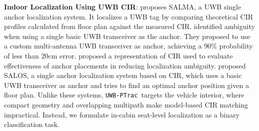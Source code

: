 \documentclass[sigconf]{acmart}
\newcommand{\name}{{{\tt UWB-PTrac}}}
\begin{document}
\noindent
\textbf{Indoor Localization Using UWB CIR}:
\cite{grosswindhager2018salma} proposes SALMA, a UWB single anchor 
localization system. It localizes a UWB tag by comparing theoretical 
CIR profiles calculated from floor plan against the measured CIR. 
\cite{grosswindhager2018salma} identified ambiguity when using a single basic 
UWB transceiver as the anchor. They proposed to use a custom multi-antenna 
UWB transceiver as anchor, achieving a 90\% probability of less than
20cm error. \cite{schmidt2019effective}
proposed a representation of CIR used to evaluate effectiveness 
of anchor placements in reducing localization ambiguity. \cite{schmidt2024salos} proposed SALOS, a single 
anchor localization system based on CIR, which uses a basic UWB transceiver 
as anchor and tries to find an optimal anchor position given a floor plan.
%
Unlike these systems, \name\ targets the vehicle interior, where compact geometry and overlapping multipath make model-based CIR matching impractical. Instead, we formulate in-cabin seat-level localization as a binary classification task.
\end{document}
